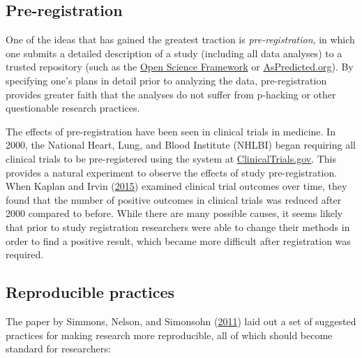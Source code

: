 \documentclass[12pt,]{book}
\theoremstyle{definition}
\theoremstyle{definition}
\theoremstyle{definition}
\theoremstyle{remark}
\begin{document}
\hypertarget{pre-registration}{%
\subsection{Pre-registration}\label{pre-registration}}

One of the ideas that has gained the greatest traction is \emph{pre-registration}, in which one submits a detailed description of a study (including all data analyses) to a trusted repository (such as the \href{http://osf.io}{Open Science Framework} or \href{http://aspredicted.org}{AsPredicted.org}). By specifying one's plans in detail prior to analyzing the data, pre-registration provides greater faith that the analyses do not suffer from p-hacking or other questionable research practices.

The effects of pre-registration have been seen in clinical trials in medicine. In 2000, the National Heart, Lung, and Blood Institute (NHLBI) began requiring all clinical trials to be pre-registered using the system at \href{http://clinicaltrials.gov}{ClinicalTrials.gov}. This provides a natural experiment to observe the effects of study pre-registration. When Kaplan and Irvin (\protect\hyperlink{ref-kapl:irvi:2015}{2015}) examined clinical trial outcomes over time, they found that the number of positive outcomes in clinical trials was reduced after 2000 compared to before. While there are many possible causes, it seems likely that prior to study registration researchers were able to change their methods in order to find a positive result, which became more difficult after registration was required.

\hypertarget{reproducible-practices}{%
\subsection{Reproducible practices}\label{reproducible-practices}}

The paper by Simmons, Nelson, and Simonsohn (\protect\hyperlink{ref-simm:nels:simo:2011}{2011}) laid out a set of suggested practices for making research more reproducible, all of which should become standard for researchers:
\end{document}

